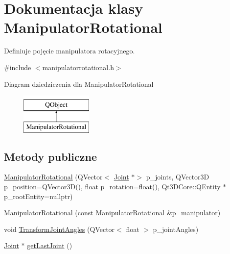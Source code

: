 \hypertarget{class_manipulator_rotational}{}\section{Dokumentacja klasy Manipulator\+Rotational}
\label{class_manipulator_rotational}


Definiuje pojęcie manipulatora rotacyjnego.  




{\ttfamily \#include $<$manipulatorrotational.\+h$>$}

Diagram dziedziczenia dla Manipulator\+Rotational\begin{figure}[H]
\begin{center}
\leavevmode
\includegraphics[height=2.000000cm]{class_manipulator_rotational}
\end{center}
\end{figure}
\subsection*{Metody publiczne}
\begin{DoxyCompactItemize}
\item 
\hyperlink{class_manipulator_rotational_adb9a71718449baa93992784d56cf86d7}{Manipulator\+Rotational} (Q\+Vector$<$ \hyperlink{class_joint}{Joint} $\ast$$>$ p\+\_\+joints, Q\+Vector3D p\+\_\+position=Q\+Vector3D(), float p\+\_\+rotation=float(), Qt3\+D\+Core\+::\+Q\+Entity $\ast$p\+\_\+root\+Entity=nullptr)
\item 
\hyperlink{class_manipulator_rotational_acb63f74aed0760ae5cdef17da2369e05}{Manipulator\+Rotational} (const \hyperlink{class_manipulator_rotational}{Manipulator\+Rotational} \&p\+\_\+manipulator)
\item 
void \hyperlink{class_manipulator_rotational_ab782bff373e4b6c7b2f75bd5dbfd2435}{Transform\+Joint\+Angles} (Q\+Vector$<$ float $>$ p\+\_\+joint\+Angles)
\item 
\hyperlink{class_joint}{Joint} $\ast$ \hyperlink{class_manipulator_rotational_a568eefeea1d7f4748655d3682e738ad5}{get\+Last\+Joint} ()
\end{DoxyCompactItemize}
